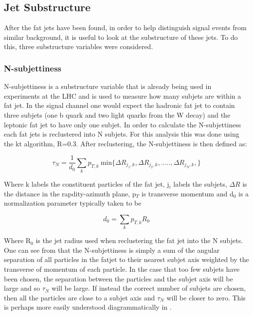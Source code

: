 \subsection{Jet Substructure}
After the fat jets have been found, in order to help distinguish signal events from similar background, it is useful to look at the substructure of these jets. To do this, three substructure variables were considered.

\subsubsection{N-subjettiness}
N-subjettiness is a substructure variable that is already being used in experiments at the LHC and is used to measure how many subjets are within a fat jet. In the signal channel one would expect the hadronic fat jet to contain three subjets (one b quark and two light quarks from the W decay) and the leptonic fat jet to have only one subjet. In order to calculate the N-subjettiness each fat jets is reclustered into N subjets. For this analysis this was done using the kt algorithm, R=0.3. After reclustering, the N-subjettiness is then defined as\cite{Thaler:2010tr}:

\begin{equation}
  \label{eq:nsubjet}
  \tau_N=\frac{1}{d_0}\sum\limits_{k}p_{T,k}~\text{min}\{\Delta R_{j_1,k},\Delta R_{j_2,k},.....,\Delta R_{j_N,k},\}
\end{equation}

Where k labels the constituent particles of the fat jet, j$_{i}$ labels the subjets, $\Delta R$ is the distance in the rapdity-azimuth plane, p$_{T}$ is transverse momentum and d$_0$ is a normalization parameter typically taken to be

\begin{equation}
  d_0=\sum\limits_{k}p_{T,k}R_0
\end{equation}

Where R$_0$ is the jet radius used when reclustering the fat jet into the N subjets. One can see from  that the N-subjettiness is simply a sum of the angular separation of all particles in the fatjet to their nearest subjet axis weighted by the transverse of momentum of each particle. In the case that too few subjets have been chosen, the separation between the particles and the subjet axis will be large and so $\tau_N$ will be large. If instead the correct number of subjets are chosen, then all the particles are close to a subjet axis and $\tau_N$ will be closer to zero. This is perhaps more easily understood diagrammatically in .

